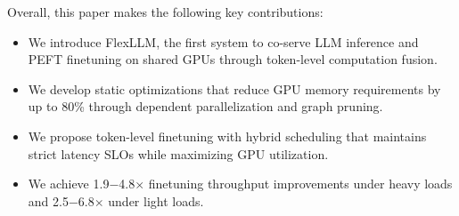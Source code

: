 Overall, this paper makes the following key contributions:
\begin{itemize}[leftmargin=10pt,parsep=1pt,topsep=2pt]
\item We introduce FlexLLM, the first system to co-serve LLM inference and PEFT finetuning on shared GPUs through token-level computation fusion.
\item We develop static optimizations that reduce GPU memory requirements by up to 80\% through dependent parallelization and graph pruning.
\item We propose token-level finetuning with hybrid scheduling that maintains strict latency SLOs while maximizing GPU utilization.
\item We achieve 1.9$-$4.8$\times$ finetuning throughput improvements under heavy loads and 2.5$-$6.8$\times$ under light loads.
\end{itemize}